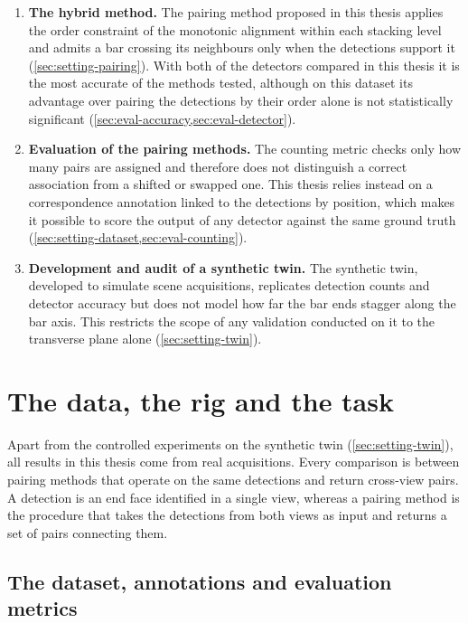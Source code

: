 \documentclass[a4paper, 12pt, twoside]{book}
\begin{document}
\begin{enumerate}
\item \textbf{The hybrid method.} The pairing method proposed in this thesis applies the order constraint of the monotonic alignment within each stacking level and admits a bar crossing its neighbours only when the detections support it (\cref{sec:setting-pairing}). With both of the detectors compared in this thesis it is the most accurate of the methods tested, although on this dataset its advantage over pairing the detections by their order alone is not statistically significant (\cref{sec:eval-accuracy,sec:eval-detector}).

\item \textbf{Evaluation of the pairing methods.} The counting metric checks only how many pairs are assigned and therefore does not distinguish a correct association from a shifted or swapped one. This thesis relies instead on a correspondence annotation linked to the detections by position, which makes it possible to score the output of any detector against the same ground truth (\cref{sec:setting-dataset,sec:eval-counting}).

\item \textbf{Development and audit of a synthetic twin.} The synthetic twin, developed to simulate scene acquisitions, replicates detection counts and detector accuracy but does not model how far the bar ends stagger along the bar axis. This restricts the scope of any validation conducted on it to the transverse plane alone (\cref{sec:setting-twin}).

\end{enumerate}

\chapter{The data, the rig and the task}
\label{ch:setting}

Apart from the controlled experiments on the synthetic twin (\cref{sec:setting-twin}), all results in this thesis come from real acquisitions. Every comparison is between pairing methods that operate on the same detections and return cross-view pairs.
A detection is an end face identified in a single view, whereas a pairing method is the procedure that takes the detections from both views as input and returns a set of pairs connecting them.

\section{The dataset, annotations and evaluation metrics}
\label{sec:setting-dataset}
\end{document}
